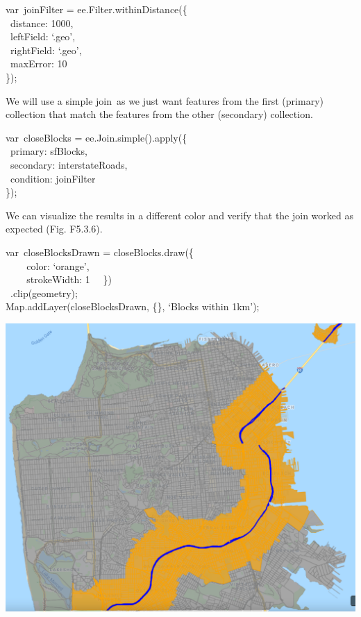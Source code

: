 \documentclass[
  letterpaper,
  DIV=11,
  numbers=noendperiod]{scrreprt}
\begin{document}
var~joinFilter = ee.Filter.withinDistance(\{\\
\hspace*{0.333em} ~distance: 1000,\\
\hspace*{0.333em} ~leftField: `.geo',\\
\hspace*{0.333em} ~rightField: `.geo',\\
\hspace*{0.333em} ~maxError: 10\\
\});

We will use a simple join~as we just want features from the first
(primary) collection that match the features from the other (secondary)
collection.

var~closeBlocks = ee.Join.simple().apply(\{\\
\hspace*{0.333em} ~primary: sfBlocks,\\
\hspace*{0.333em} ~secondary: interstateRoads,\\
\hspace*{0.333em} ~condition: joinFilter\\
\});

We can visualize the results in a different color and verify that the
join worked as expected (Fig. F5.3.6).

var~closeBlocksDrawn = closeBlocks.draw(\{\\
\hspace*{0.333em} ~ ~ ~color: `orange',\\
\hspace*{0.333em} ~ ~ ~strokeWidth: 1~ ~\})\\
\hspace*{0.333em} ~.clip(geometry);\\
Map.addLayer(closeBlocksDrawn, \{\}, `Blocks within 1km');

\includegraphics{./F5/image40.png}
\end{document}
